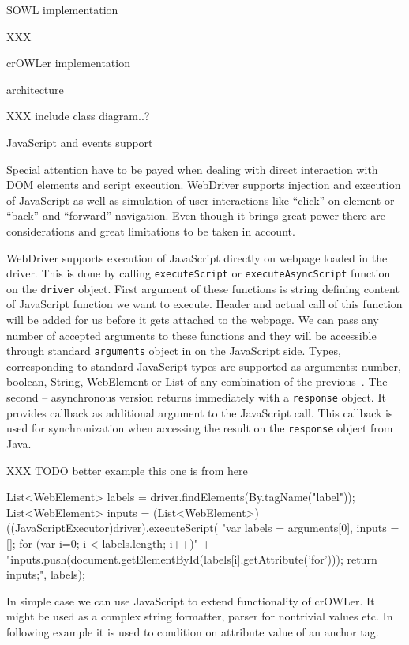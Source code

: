 \sec SOWL implementation

XXX 

\sec crOWLer implementation

\secc architecture

XXX include class diagram..?


\secc JavaScript and events support

Special attention have to be payed when dealing with direct interaction with
DOM elements and script execution. WebDriver supports injection and execution
of JavaScript as well as simulation of user interactions like ``click'' on
element or ``back'' and ``forward'' navigation. Even though it brings great
power there are considerations and great limitations to be taken in account. 

WebDriver supports execution of JavaScript directly on webpage loaded in the
driver. This is done by calling {\tt executeScript} or {\tt executeAsyncScript}
function on the {\tt driver} object. First argument of these functions is
string defining content of JavaScript function we want to execute. Header and
actual call of this function will be added for us before it gets attached to
the webpage. We can pass any number of accepted arguments to these functions
and they will be accessible through standard {\tt arguments} object in on the
JavaScript side. Types, corresponding to standard JavaScript types are
supported as arguments: number, boolean, String, WebElement or List of any
combination of the previous~. The second -- asynchronous version returns
immediately with a {\tt response} object. It provides callback as additional
argument to the JavaScript call. This callback is used for synchronization when
accessing the result on the {\tt response} object from Java.  

XXX TODO better example this one is from
here~

\begtt
List<WebElement> labels = driver.findElements(By.tagName("label"));
List<WebElement> inputs = (List<WebElement>) ((JavaScriptExecutor)driver).executeScript(
    "var labels = arguments[0], inputs = []; for (var i=0; i < labels.length; i++){" +
    "inputs.push(document.getElementById(labels[i].getAttribute('for'))); } return inputs;", labels);
\endtt

In simple case we can use JavaScript to extend functionality of crOWLer. It
might be used as a complex string formatter, parser for nontrivial values etc. 
In following example it is used to condition on attribute value of an anchor
tag. 

